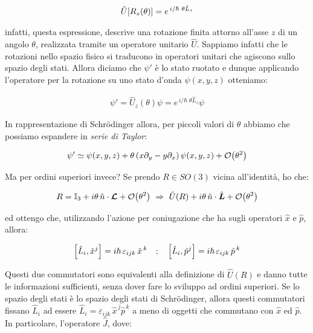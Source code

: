 \begin{align*}
	\hat{U}\qty[ R_z(\theta) ] = e^{\, i/\hbar \,\, \theta \hat{L}_z}
\end{align*}

	infatti, questa espressione, descrive una rotazione finita attorno all'asse $z$ di un angolo $\theta$, realizzata tramite un operatore unitario $\hat{U}$. Sappiamo infatti che le rotazioni nello spazio fisico si traducono in operatori unitari che agiscono sullo spazio degli stati. Allora diciamo che $\psi'$ è lo stato ruotato e dunque applicando l'operatore per la rotazione su uno stato d’onda $\psi(x, y, z)$ otteniamo:
	
\begin{align*}
	 \psi' = \hat{U}_z(\theta) \psi =  e^{\, i/\hbar \,\, \theta \hat{L}_z} \psi
\end{align*}

	In rappresentazione di Schrödinger allora, per piccoli valori di $\theta$ abbiamo che possiamo espandere in \textit{serie di Taylor}:
	
\begin{align*}
	\psi'  \simeq \psi\qty(x, y, z) + \theta \, \qty(x\partial_y - y \partial_x) \, \psi\qty(x, y, z) + \order{\theta^2}
\end{align*}
	
	Ma per ordini superiori invece? Se prendo $R \in SO(3)$ vicina all'identità, ho che:
	
\begin{align*}
	R = \mathbb{I}_3 + i\theta \, \hat{n} \cdot \vb*{\mathcal{L}} + \order{\theta^2} \,\, \Rightarrow \,\, \hat{U}(R) + i\theta \, \hat{n} \cdot \hat{\vb*{L}} + \order{\theta^2} 
\end{align*}

	ed ottengo che, utilizzando l'azione per coniugazione che ha sugli operatori $\hat{x}$ e $\hat{p}$, allora:
	
\begin{align*}
	\qty[\hat{L}_i, \hat{x}^j] = i\hbar \, \varepsilon_{ijk} \, \hat{x}^{\, k} \quad ; \quad \qty[\hat{L}_i, \hat{p}^j] = i\hbar \, \varepsilon_{ijk} \, \hat{p}^{\, k} 
\end{align*}

	Questi due commutatori sono equivalenti alla definizione di $\hat{U}(R)$ e danno tutte le informazioni sufficienti, senza dover fare lo sviluppo ad ordini superiori. Se lo spazio degli stati è lo spazio degli stati di Schrödinger, allora questi commutatori fissano $\hat{L}_i$ ad essere $\hat{L}_i = \varepsilon_{ijk} \, \hat{x}^{\, j} \hat{p}^{\, k}$ a meno di oggetti che commutano con $\hat{x}$ ed $\hat{p}$. In particolare, l'operatore $\hat{J} $, dove:

